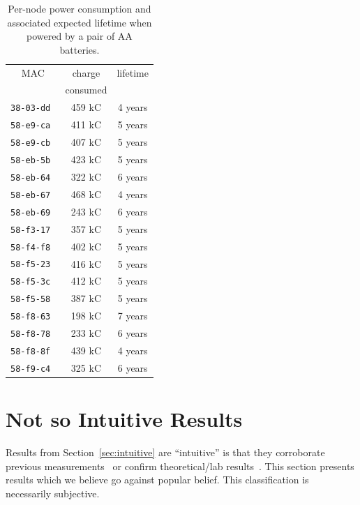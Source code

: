 \documentclass{elsarticle}
\newcommand{\building}            {Smart Building\xspace}
\newcommand{\agri}                {Smart Agriculture\xspace}
\begin{document}
\begin{table}
\begin{subtable}{.5\textwidth}
    \caption{\agri}
\end{subtable}\hfill
\begin{subtable}{.43\textwidth}
    \begin{tabular}{|c|c|c|}
        \toprule
        MAC           &  charge  & lifetime \\
                      & consumed &          \\
        \midrule
        \tt{38-03-dd} &   459 kC &  4 years \\
        \tt{58-e9-ca} &   411 kC &  5 years \\
        \tt{58-e9-cb} &   407 kC &  5 years \\
        \tt{58-eb-5b} &   423 kC &  5 years \\
        \tt{58-eb-64} &   322 kC &  6 years \\
        \tt{58-eb-67} &   468 kC &  4 years \\
        \tt{58-eb-69} &   243 kC &  6 years \\
        \tt{58-f3-17} &   357 kC &  5 years \\
        \tt{58-f4-f8} &   402 kC &  5 years \\
        \tt{58-f5-23} &   416 kC &  5 years \\
        \tt{58-f5-3c} &   412 kC &  5 years \\
        \tt{58-f5-58} &   387 kC &  5 years \\
        \tt{58-f8-63} &   198 kC &  7 years \\
        \tt{58-f8-78} &   233 kC &  6 years \\
        \tt{58-f8-8f} &   439 kC &  4 years \\
        \tt{58-f9-c4} &   325 kC &  6 years \\
        \bottomrule
    \end{tabular}
    \caption{\building}
\end{subtable}\hfill
\caption{Per-node power consumption and associated expected lifetime when powered by a pair of AA batteries.}
\label{tab:stats_charge}
\end{table}

\section{Not so Intuitive Results}
\label{sec:notsointuitive}

Results from Section~\ref{sec:intuitive} are ``intuitive'' is that they corroborate previous measurements~\cite{watteyne16peach} or confirm theoretical/lab results~\cite{watteyne10mitigating,watteyne09reliability,watteyne15industrial}.
This section presents results which we believe go against popular belief.
This classification is necessarily subjective.
\end{document}
